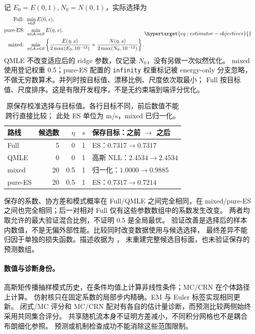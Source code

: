 记 \(E_0=E(0,1),N_0=N(0,1)\)，实际选择为
\begin{equation}
\begin{aligned}
\text{Full: }&\min_{s\in\mathcal S} E(0,s),\\
\text{pure-ES: }&\min_{\eta\in\mathcal A,s\in\mathcal S}E(\eta,s),\\
\text{mixed: }&\min_{\eta\in\mathcal A,s\in\mathcal S}
 \left\{\frac{E(\eta,s)}{2\max(E_0,10^{-12})}
       +\frac{N(\eta,s)}{2\max(N_0,10^{-12})}\right\}.
\end{aligned}
\label{eq:estimator-objectives}\hypertarget{eq:estimator-objectives}{}
\end{equation}
QMLE 不改变适应后的 ridge 参数，仅记录 \(N_0\)，没有另做一次似然优化。
mixed 使用登记权重 0.5；pure-ES 配置的 \texttt{infinity} 权重标记被 energy-only
分支忽略，不做无穷数算术。并列时按目标值、漂移比例、尺度依次取最小；
Full 按目标值、尺度排序。这是有限开发程序，不是无约束端到端评分优化。

\begin{table}[htbp]
\centering\small
\caption{原保存校准选择与目标值。各行目标不同，前后数值不能跨行直接比较；
此处 ES 单位为 m/s，mixed 已归一化。}
\label{tab:estimator-calibration}\hypertarget{tab:estimator-calibration}{}
\begin{tabular}{lrrrl}
\toprule
路线 & 候选数 & \(\eta\) & \(s\) & 保存目标：之前 \(\to\) 之后\\
\midrule
Full & 5 & 0 & 1 & ES：\(0.7317\to0.7317\)\\
QMLE & 0 & 0 & 1 & 高斯 NLL：\(2.4534\to2.4534\)\\
mixed & 20 & 0.5 & 1 & 归一化：\(1.0000\to0.9885\)\\
pure-ES & 20 & 0.5 & 1 & ES：\(0.7317\to0.7214\)\\
\bottomrule
\end{tabular}
\end{table}

保存的系数、协方差和模式概率在 Full/QMLE 之间完全相同，在 mixed/pure-ES
之间也完全相同；后一对相对 Full 仅有这些参数数组中的系数发生改变。
两者均取允许的最大验证混合比例，不证明 0.5 是全局最优。
验证改善是选择后的样本内数值，不是无偏外部性能。比较同时改变数据使用与候选选择，
最终差异不能归因于单独的损失函数。描述收据为
，
未重建完整候选目标面，也未验证保存的预测数组。

\paragraph{数值与诊断身份。}
高斯矩传播抽样模式历史，在条件均值上计算非线性条件；MC/CRN 在个体路径上计算。
仿射核只在固定系数的局部步内精确。EM 与 Euler 标签实现相同更新。
闭式/MC 评分和 MC/CRN 配对有各自的估计量诊断，而预测比较两侧始终采用共同集合评分。
共享随机流本身不证明方差减小，不同积分网格也不是耦合布朗细化参照。
预测或机制检查成功不能消除这些范围限制。

